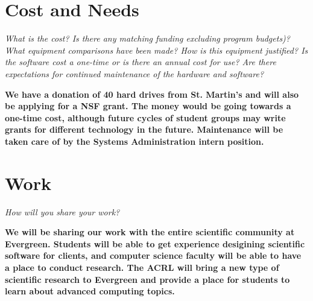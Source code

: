 \documentclass{article}
\begin{document}
 
\section{Cost and Needs}
\textit{What is the cost?  Is there any matching funding
excluding program budgets)?  What equipment comparisons have been made?
How is this equipment justified?  Is the software cost a one-time or is
there an annual cost for use?  Are there expectations for continued
maintenance of the hardware and software?}

\textbf{We have a donation of 40 hard drives from St. Martin's and will also be applying for a NSF grant.  The money would be going towards a one-time cost, although future cycles of student groups may write grants for different technology in the future.  Maintenance will be taken care of by the Systems Administration intern position.
}

\section{Work}
\textit{How will you share your work?}

\textbf{We will be sharing our work with the entire scientific community at Evergreen.  Students will be able to get experience desigining scientific software for clients, and computer science faculty will be able to have a place to conduct research.  The ACRL will bring a new type of scientific research to Evergreen and provide a place for students to learn about advanced computing topics.}
\end{document}

